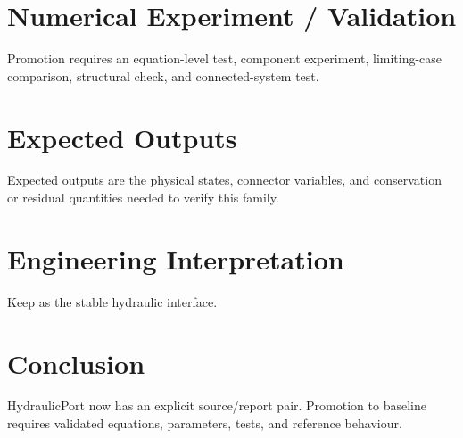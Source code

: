 \documentclass[10pt,a4paper]{article}
\begin{document}
\section{Numerical Experiment / Validation}
Promotion requires an equation-level test, component experiment, limiting-case comparison, structural check, and connected-system test.
\section{Expected Outputs}
Expected outputs are the physical states, connector variables, and conservation or residual quantities needed to verify this family.
\section{Engineering Interpretation}
Keep as the stable hydraulic interface.
\section*{Conclusion}
HydraulicPort now has an explicit source/report pair. Promotion to baseline requires validated equations, parameters, tests, and reference behaviour.
\end{document}
